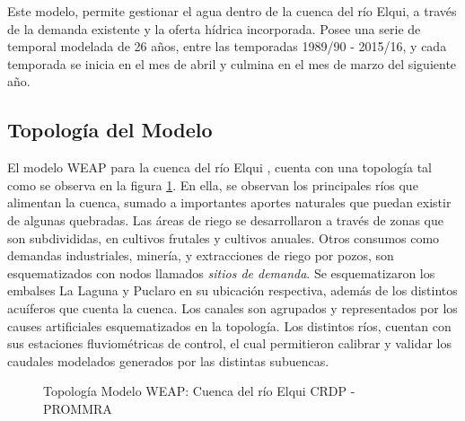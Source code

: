 \documentclass[11pt,]{article}
\begin{document}
Este modelo, permite gestionar el agua dentro de la cuenca del río Elqui, a través de la demanda existente y la oferta hídrica incorporada. Posee una serie de temporal modelada de 26 años, entre las temporadas 1989/90 - 2015/16, y cada temporada se inicia en el mes de abril y culmina en el mes de marzo del siguiente año. 

	\subsection{Topología del Modelo}
	
	El modelo WEAP para la cuenca del río Elqui , cuenta con una topología tal como se observa en la figura \ref{etiqueta_figura6}. En ella, se observan los principales ríos que alimentan la cuenca, sumado a  importantes aportes naturales que puedan existir de algunas quebradas. Las áreas de riego se desarrollaron a través de zonas que son subdivididas, en cultivos frutales y cultivos anuales. Otros consumos como demandas industriales, minería, y extracciones de riego por pozos, son esquematizados con nodos llamados \textit{sitios de demanda}. Se esquematizaron los embalses La Laguna y Puclaro en su ubicación respectiva, además de los distintos acuíferos que cuenta la cuenca. Los canales son agrupados y representados por los causes artificiales esquematizados en la topología.  Los distintos ríos, cuentan con sus estaciones fluviométricas de control, el cual permitieron calibrar y validar los caudales modelados generados por las distintas subuencas.

\begin{figure}[H]
\begin{center}
\caption{Topología Modelo WEAP: Cuenca del río Elqui CRDP - PROMMRA}
\label{etiqueta_figura6}
\end{center}
\end{figure}
\end{document}
